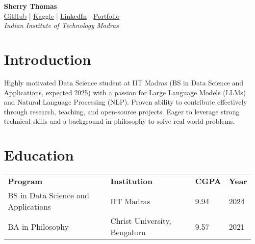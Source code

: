 \documentclass[a4paper,10pt]{article}
\begin{document}
\pagestyle{empty}

\begin{center}
    \textbf{{\LARGE Sherry Thomas}} \\
    \href{https://github.com/SherryS997}{GitHub} | \href{https://www.kaggle.com/iveeaten3223times}{Kaggle} | \href{https://www.linkedin.com/in/sherry-thomassp/}{LinkedIn} | \href{https://sherrys997.github.io/}{Portfolio} \\
    \textit{Indian Institute of Technology Madras}
\end{center}

\section*{Introduction}
Highly motivated Data Science student at IIT Madras (BS in Data Science and Applications, expected 2025) with a passion for Large Language Models (LLMs) and Natural Language Processing (NLP). Proven ability to contribute effectively through research, teaching, and open-source projects. Eager to leverage strong technical skills and a background in philosophy to solve real-world problems.

\section*{Education}
\begin{tabular}{llll}
    \textbf{Program} & \textbf{Institution} & \textbf{CGPA} & \textbf{Year} \\
    BS in Data Science and Applications & IIT Madras & 9.94 & 2024 \\
    BA in Philosophy & Christ University, Bengaluru & 9.57 & 2021 \\
\end{tabular}
\end{document}
